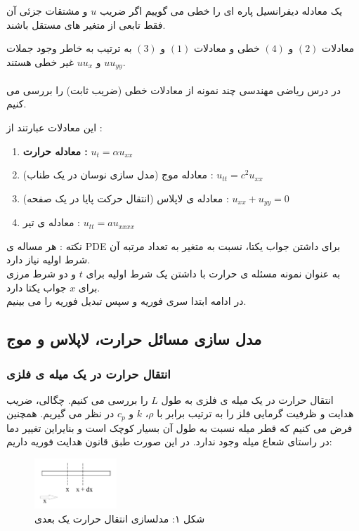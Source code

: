 \begin{definition}
	یک معادله دیفرانسیل پاره ای را خطی می گوییم اگر ضریب
	$u$
	و مشتقات جزئی آن فقط تابعی از متغیر های مستقل باشند.
\end{definition}
معادلات
$(2)$
و
$(4)$
خطی و معادلات 
$(1)$
و
$(3)$
به ترتیب به خاطر وجود جملات
$uu_{yy}$
و
$uu_x$
غیر خطی هستند.\\
\\
در درس ریاضی مهندسی چند نمونه از معادلات خطی (ضریب ثابت) را بررسی می کنیم.

این معادلات عبارتند از :
\begin{enumerate}
	\item 
	\textbf{
		معادله حرارت : 
	}
	$u_t=\alpha u_{xx}$
	\item
	معادله موج (مدل سازی نوسان در یک طناب) : 
	$u_{tt}=c^2u_{xx}$
	\item
	معادله ی لاپلاس (انتقال حرکت پایا در یک صفحه) : 
	$u_{xx}+u_{yy}=0$
	\item
	معادله ی تیر :
	$u_{tt}=au_{xxxx}$
\end{enumerate}

نکته : هر مساله ی 
PDE
برای داشتن جواب یکتا، نسبت به متغیر به تعداد مرتبه آن شرط اولیه نیاز دارد.\\
به عنوان نمونه مسئله ی حرارت با داشتن یک شرط اولیه برای 
$t$
و دو شرط مرزی برای 
$x$
جواب یکتا دارد.\\
در ادامه ابتدا سری فوریه و سپس تبدیل فوریه را می بینیم.
\subsection*{مدل سازی مسائل حرارت، لاپلاس و موج}
\subsubsection{انتقال حرارت در یک میله ی فلزی}
انتقال حرارت در یک میله ی فلزی به طول $L$
را بررسی می کنیم. چگالی، ضریب هدایت و ظرفیت گرمایی فلز را به ترتیب برابر با $\rho$، $k$ و  $c_p$ در نظر می گیریم. همچنین فرض می کنیم که قطر میله نسبت به طول آن بسیار کوچک است و بنایراین تغییر دما در راستای شعاع میله وجود ندارد. در این صورت طبق قانون هدایت فوریه داریم:
\begin{figure}[H]
	\centering
	\includegraphics[width=0.275\textwidth]{im01.jpg}
	\caption*{شکل ۱: مدلسازی انتقال حرارت یک بعدی\\
		\large{
		}
	}
\end{figure}

